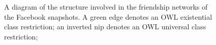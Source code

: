 																																																																																																																																																																																																																																																																																																																																																																																																																																																								\begin{figure}[!ht]
																																																																																																																																																																																																																																																																																																																																																																																																																																																									\centering
																																																																																																																																																																																																																																																																																																																																																																																																																																																										\caption{A diagram of the structure involved in the friendship networks
																																																																																																																																																																																																																																																																																																																																																																																																																																																											of the Facebook snapshots.
																																																																																																																																																																																																																																																																																																																																																																																																																																																												A green edge denotes an OWL existential class restriction;
																																																																																																																																																																																																																																																																																																																																																																																																																																																													an inverted nip denotes an OWL universal class restriction;
}
\end{figure}
